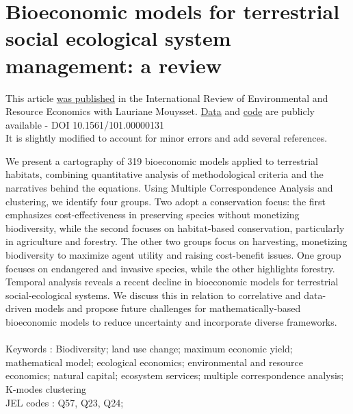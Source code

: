 \chapter{Bioeconomic models for terrestrial social ecological system management: a review}
\label{chapter1}

\begin{center}
\begin{minipage}{0.9\textwidth}
\singlespacing
This article \href{https://sim-jean.github.io/files/research/jean_mouysset2022.pdf}{was published} in the International Review of Environmental and Resource Economics with Lauriane Mouysset. \href{https://zenodo.org/records/6656433}{Data} and \href{https://github.com/sim-jean/review-irere/tree/main}{code} are publicly available - DOI 10.1561/101.00000131\\
It is slightly modified to account for minor errors and add several references.
\end{minipage}

\vspace*{.5cm}


\begin{minipage}{0.9\textwidth}
\singlespacing
We present a cartography of 319 bioeconomic models applied to terrestrial habitats, combining quantitative analysis of methodological criteria and the narratives behind the equations. Using Multiple Correspondence Analysis and clustering, we identify four groups. Two adopt a conservation focus: the first emphasizes cost-effectiveness in preserving species without monetizing biodiversity, while the second focuses on habitat-based conservation, particularly in agriculture and forestry. The other two groups focus on harvesting, monetizing biodiversity to maximize agent utility and raising cost-benefit issues. One group focuses on endangered and invasive species, while the other highlights forestry. Temporal analysis reveals a recent decline in bioeconomic models for terrestrial social-ecological systems. We discuss this in relation to correlative and data-driven models and propose future challenges for mathematically-based bioeconomic models to reduce uncertainty and incorporate diverse frameworks.
\\\\
Keywords : Biodiversity; land use change; maximum economic yield; mathematical model; ecological economics; environmental and resource economics; natural capital; ecosystem services; multiple correspondence analysis; K-modes clustering\\
JEL codes : Q57, Q23, Q24;
\end{minipage}
\end{center}
    \vfill
\newpage

